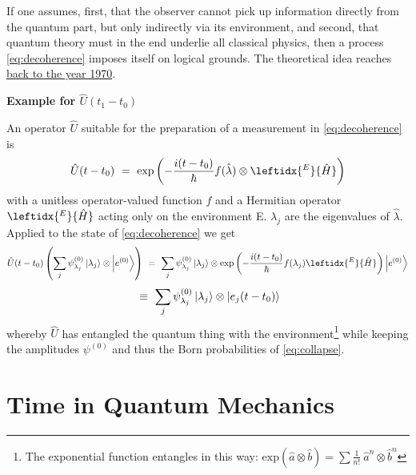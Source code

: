 \documentclass[12pt]{article}
\begin{document}
If one assumes, first, that the observer cannot pick up information directly from the quantum part, but only indirectly via its environment, and second, that quantum theory must in the end underlie all classical physics, then a process \eqref{eq:decoherence} imposes itself on logical grounds. The theoretical idea reaches \href{https://de.wikipedia.org/wiki/Dieter_Zeh}{back to the year 1970}.
 
\textbf{Example for $\hat{U}(t_1-t_0)$}

An operator $\hat{U}$ suitable for the preparation of a measurement in \eqref{eq:decoherence} is
\begin{equation}
\label{eq:decoherence_measurement}
\hat{U}(t-t_0)\ =\ \mathrm{exp}\left(-\frac{i(t-t_0)}{\hbar}f(\hat{\lambda})\otimes \leftidx{^E}{\hat{H}}\right)
\end{equation}
with a unitless operator-valued function $f$ and a Hermitian operator $\leftidx{^E}{\hat{H}}$ acting only on the environment E. $\lambda_j$ are the eigenvalues of $\hat{\lambda}$.
Applied to the state of \eqref{eq:decoherence} we get
\begin{equation*}
\hat{U}(t-t_0)\left(\sum_j \psi^{(0)}_{\lambda_j} \ket{\lambda_j}\otimes\ket{e^{(0)}}\right)
\ =\ \sum_j \psi^{(0)}_{\lambda_j} \ket{\lambda_j} 
\otimes \mathrm{exp}\left(-\frac{i(t-t_0)}{\hbar}f(\lambda_j)\leftidx{^E}{\hat{H}}\right)
\ket{e^{(0)}} 
\end{equation*}
\begin{equation}
\label{eq:entangled_environment}
\ \equiv\ 
\sum_j \psi^{(0)}_{\lambda_j} \ket{\lambda_j} 
\otimes \ket{e_j(t-t_0)} 
\end{equation}
whereby $\hat{U}$ has entangled the quantum thing with the environment\footnote{The exponential function entangles in this way: $\mathrm{exp}(\hat{a}\otimes\hat{b})=\sum \frac{1}{n\mathrm{! }}\ \hat{a}^n\otimes\hat{b}^n$} while keeping the amplitudes $\psi^{(0)}$ and thus the Born probabilities of \eqref{eq:collapse}.

\section{Time in Quantum Mechanics}
\end{document}
